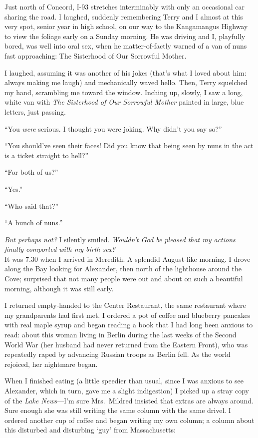 Just north of Concord, I-93 stretches interminably with only an
occasional car sharing the road. I laughed, suddenly remembering Terry
and I almost at this very spot, senior year in high school, on our way
to the Kangamangus Highway to view the foliage early on a Sunday
morning. He was driving and I, playfully bored, was well into oral sex,
when he matter-of-factly warned of a van of nuns fast approaching: The
Sisterhood of Our Sorrowful Mother.

I laughed, assuming it was another of his jokes (that's what I loved
about him: always making me laugh) and mechanically waved hello. Then,
Terry squelched my hand, scrambling me toward the window. Inching up,
slowly, I saw a long, white van with \emph{The Sisterhood of Our
Sorrowful Mother} painted in large, blue letters, just passing.

``You \emph{were} serious. I thought you were joking. Why didn't you say
so?''

``You should've seen their faces! Did you know that being seen by nuns
in the act is a ticket straight to hell?''

``For both of us?''

``Yes.''

``Who said that?''

``A bunch of nuns.''

\emph{But perhaps not?} I silently smiled. \emph{Wouldn't God be pleased
that my actions finally comported with my birth sex?}\\

It was 7.30 when I arrived in Meredith. A splendid August-like morning.
I drove along the Bay looking for Alexander, then north of the
lighthouse around the Cove; surprised that not many people were out and
about on such a beautiful morning, although it was still early.

I returned empty-handed to the Center Restaurant, the same restaurant
where my grandparents had first met. I ordered a pot of coffee and
blueberry pancakes with real maple syrup and began reading a book that I
had long been anxious to read: about this woman living in Berlin during
the last weeks of the Second World War (her husband had never returned
from the Eastern Front), who was repeatedly raped by advancing Russian
troops as Berlin fell. As the world rejoiced, her nightmare began.

When I finished eating (a little speedier than usual, since I was
anxious to see Alexander, which in turn, gave me a slight indigestion) I
picked up a stray copy of the \emph{Lake News}---I'm sure Mrs.~Mildred
insisted that extras are always around. Sure enough she was still
writing the same column with the same drivel. I ordered another cup of
coffee and began writing my own column; a column about this disturbed
and disturbing `guy' from Massachusetts:

